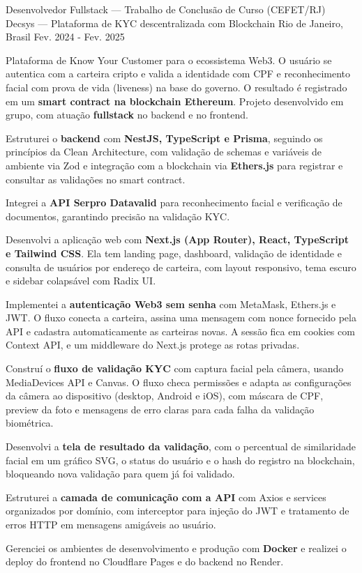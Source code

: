 \begin{cventries}
  \cventry
    {Desenvolvedor Fullstack --- Trabalho de Conclusão de Curso (CEFET/RJ)} %
    {Decsys --- Plataforma de KYC descentralizada com Blockchain} %
    {Rio de Janeiro, Brasil} %
    {Fev. 2024 - Fev. 2025} %
    {
      \begin{cvitems} %
        \item {Plataforma de Know Your Customer para o ecossistema Web3. O usuário se autentica com a carteira cripto e valida a identidade com CPF e reconhecimento facial com prova de vida (liveness) na base do governo. O resultado é registrado em um \textbf{smart contract na blockchain Ethereum}. Projeto desenvolvido em grupo, com atuação \textbf{fullstack} no backend e no frontend.}
        \item {Estruturei o \textbf{backend} com \textbf{NestJS, TypeScript e Prisma}, seguindo os princípios da Clean Architecture, com validação de schemas e variáveis de ambiente via Zod e integração com a blockchain via \textbf{Ethers.js} para registrar e consultar as validações no smart contract.}
        \item {Integrei a \textbf{API Serpro Datavalid} para reconhecimento facial e verificação de documentos, garantindo precisão na validação KYC.}
        \item {Desenvolvi a aplicação web com \textbf{Next.js (App Router), React, TypeScript e Tailwind CSS}. Ela tem landing page, dashboard, validação de identidade e consulta de usuários por endereço de carteira, com layout responsivo, tema escuro e sidebar colapsável com Radix UI.}
        \item {Implementei a \textbf{autenticação Web3 sem senha} com MetaMask, Ethers.js e JWT. O fluxo conecta a carteira, assina uma mensagem com nonce fornecido pela API e cadastra automaticamente as carteiras novas. A sessão fica em cookies com Context API, e um middleware do Next.js protege as rotas privadas.}
        \item {Construí o \textbf{fluxo de validação KYC} com captura facial pela câmera, usando MediaDevices API e Canvas. O fluxo checa permissões e adapta as configurações da câmera ao dispositivo (desktop, Android e iOS), com máscara de CPF, preview da foto e mensagens de erro claras para cada falha da validação biométrica.}
        \item {Desenvolvi a \textbf{tela de resultado da validação}, com o percentual de similaridade facial em um gráfico SVG, o status do usuário e o hash do registro na blockchain, bloqueando nova validação para quem já foi validado.}
        \item {Estruturei a \textbf{camada de comunicação com a API} com Axios e services organizados por domínio, com interceptor para injeção do JWT e tratamento de erros HTTP em mensagens amigáveis ao usuário.}
        \item {Gerenciei os ambientes de desenvolvimento e produção com \textbf{Docker} e realizei o deploy do frontend no Cloudflare Pages e do backend no Render.}
      \end{cvitems}
    }


\end{cventries}
